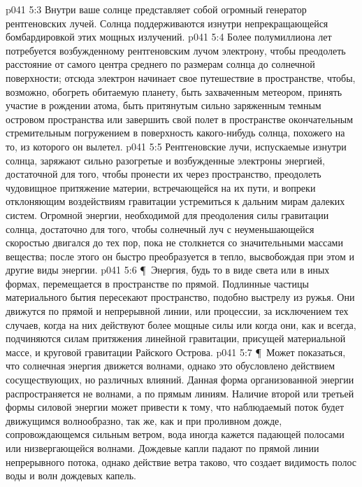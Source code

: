 \vs p041 5:3 Внутри ваше солнце представляет собой огромный генератор рентгеновских лучей. Солнца поддерживаются изнутри непрекращающейся бомбардировкой этих мощных излучений.
\vs p041 5:4 Более полумиллиона лет потребуется возбужденному рентгеновским лучом электрону, чтобы преодолеть расстояние от самого центра среднего по размерам солнца до солнечной поверхности; отсюда электрон начинает свое путешествие в пространстве, чтобы, возможно, обогреть обитаемую планету, быть захваченным метеором, принять участие в рождении атома, быть притянутым сильно заряженным темным островом пространства или завершить свой полет в пространстве окончательным стремительным погружением в поверхность какого\hyp{}нибудь солнца, похожего на то, из которого он вылетел.
\vs p041 5:5 Рентгеновские лучи, испускаемые изнутри солнца, заряжают сильно разогретые и возбужденные электроны энергией, достаточной для того, чтобы пронести их через пространство, преодолеть чудовищное притяжение материи, встречающейся на их пути, и вопреки отклоняющим воздействиям гравитации устремиться к дальним мирам далеких систем. Огромной энергии, необходимой для преодоления силы гравитации солнца, достаточно для того, чтобы солнечный луч с неуменьшающейся скоростью двигался до тех пор, пока не столкнется со значительными массами вещества; после этого он быстро преобразуется в тепло, высвобождая при этом и другие виды энергии.
\vs p041 5:6 \P\ Энергия, будь то в виде света или в иных формах, перемещается в пространстве по прямой. Подлинные частицы материального бытия пересекают пространство, подобно выстрелу из ружья. Они движутся по прямой и непрерывной линии, или процессии, за исключением тех случаев, когда на них действуют более мощные силы или когда они, как и всегда, подчиняются силам притяжения линейной гравитации, присущей материальной массе, и круговой гравитации Райского Острова.
\vs p041 5:7 \P\ Может показаться, что солнечная энергия движется волнами, однако это обусловлено действием сосуществующих, но различных влияний. Данная форма организованной энергии распространяется не волнами, а по прямым линиям. Наличие второй или третьей формы силовой энергии может привести к тому, что наблюдаемый поток будет  движущимся волнообразно, так же, как и при проливном дожде, сопровождающемся сильным ветром, вода иногда кажется падающей полосами или низвергающейся волнами. Дождевые капли падают по прямой линии непрерывного потока, однако действие ветра таково, что создает видимость полос воды и волн дождевых капель.
